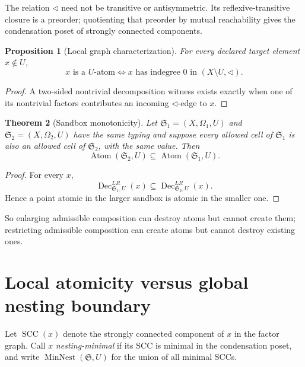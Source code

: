 \documentclass[11pt]{article}
\newtheorem{theorem}{Theorem}[section]
\newtheorem{proposition}[theorem]{Proposition}
\theoremstyle{definition}
\theoremstyle{remark}
\newcommand{\Sbx}{\mathfrak S}
\newcommand{\Atom}{\operatorname{Atom}}
\newcommand{\Dec}{\operatorname{Dec}}
\newcommand{\MinNest}{\operatorname{MinNest}}
\newcommand{\SCC}{\operatorname{SCC}}
\begin{document}
The relation \(\triangleleft\) need not be transitive or antisymmetric. Its reflexive-transitive closure is a preorder; quotienting that preorder by mutual reachability gives the condensation poset of strongly connected components.

\begin{proposition}[Local graph characterization]
For every declared target element \(x\notin U\),
\begin{equation}
\boxed{x\text{ is a }U\text{-atom}\iff x\text{ has indegree }0\text{ in }(X\setminus U,\triangleleft).}
\label{eq:indegree}
\end{equation}
\end{proposition}

\begin{proof}
A two-sided nontrivial decomposition witness exists exactly when one of its nontrivial factors contributes an incoming \(\triangleleft\)-edge to \(x\).
\end{proof}

\begin{theorem}[Sandbox monotonicity]
Let \(\Sbx_1=(X,\Omega_1,U)\) and \(\Sbx_2=(X,\Omega_2,U)\) have the same typing and suppose every allowed cell of \(\Sbx_1\) is also an allowed cell of \(\Sbx_2\), with the same value. Then
\begin{equation}
\boxed{\Atom(\Sbx_2,U)\subseteq\Atom(\Sbx_1,U).}
\label{eq:monotonicity}
\end{equation}
\end{theorem}

\begin{proof}
For every \(x\),
\[
\Dec^{LR}_{\Sbx_1,U}(x)\subseteq\Dec^{LR}_{\Sbx_2,U}(x).
\]
Hence a point atomic in the larger sandbox is atomic in the smaller one.
\end{proof}

So enlarging admissible composition can destroy atoms but cannot create them; restricting admissible composition can create atoms but cannot destroy existing ones.

\section{Local atomicity versus global nesting boundary}

Let \(\SCC(x)\) denote the strongly connected component of \(x\) in the factor graph. Call \(x\) \emph{nesting-minimal} if its SCC is minimal in the condensation poset, and write \(\MinNest(\Sbx,U)\) for the union of all minimal SCCs.
\end{document}
